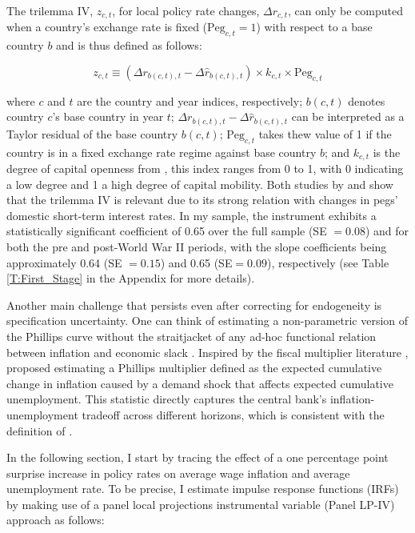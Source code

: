 \documentclass[12pt]{article}
\begin{document}
The trilemma IV, $z_{c,t}$, for local policy rate changes, $\Delta r_{c,t}$, can only be computed when a country's exchange rate is fixed ($\text{Peg}_{c,t}=1$) with respect to a base country $b$ and is thus defined as follows:

\begin{equation} \label{EQ:trilemmaIV}
	z_{c,t} \equiv (\Delta r_{b(c,t),t} - \Delta \hat{r}_{b(c,t),t}) \times k_{c,t} \times \text{Peg}_{c,t}
\end{equation}

where $c$ and $t$ are the country and year indices, respectively; $b(c,t)$ denotes country $c$'s base country in year $t$; $\Delta r_{b(c,t),t} - \Delta \hat{r}_{b(c,t),t}$ can be interpreted as a Taylor residual of the base country $b(c,t)$; $\text{Peg}_{c,t}$ takes thew value of 1 if the country is in a fixed exchange rate regime against base country $b$; and $k_{c,t}$ is the degree of capital openness from \cite{Quinn2011}, this index ranges from 0 to 1, with 0 indicating a low degree and 1 a high degree of capital mobility. Both studies by \cite{Jorda2019} and \cite{Schularick2020} show that the trilemma IV is relevant due to its strong relation with changes in pegs' domestic short-term interest rates. In my sample, the instrument exhibits a statistically significant coefficient of 0.65 over the full sample (SE $=0.08$) and for both the pre and post-World War II periods, with the slope coefficients being approximately 0.64 (SE $=0.15$) and 0.65 (SE$=0.09$), respectively (see Table \ref{T:First_Stage} in the Appendix for more details).

Another main challenge that persists even after correcting for endogeneity is specification uncertainty. One can think of estimating a non-parametric version of the Phillips curve without the straitjacket of any ad-hoc functional relation between inflation and economic slack \citep{Gali2019}. Inspired by the fiscal multiplier literature \citep{Ramey2018}, \cite{Barnichon2019} proposed estimating a Phillips multiplier defined as the expected cumulative change in inflation caused by a demand shock that affects expected cumulative unemployment. This statistic directly captures the central bank's inflation-unemployment tradeoff across different horizons, which is consistent with the definition of \cite{Mankiw2001}.

In the following section, I start by tracing the effect of a one percentage point surprise increase in policy rates on average wage inflation and average unemployment rate. To be precise, I estimate impulse response functions (IRFs) by making use of a panel local projections instrumental variable (Panel LP-IV) approach \citep{Jorda2005, Stock2018} as follows:
\end{document}
